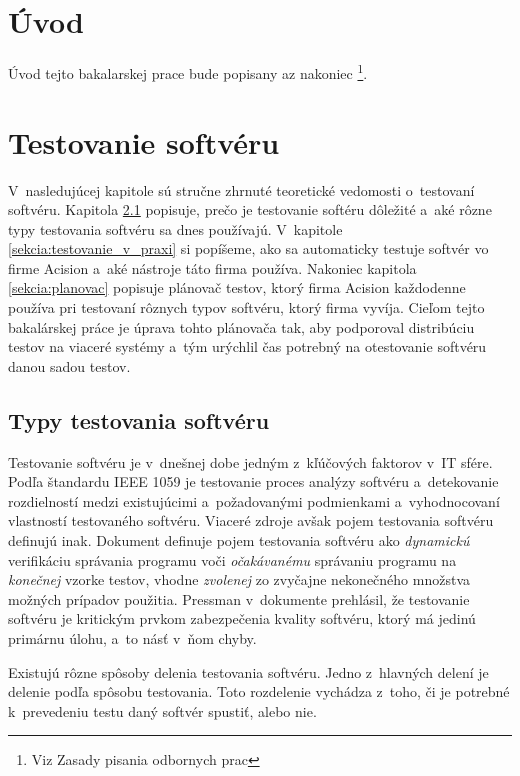 
\chapter{Úvod}
Úvod tejto bakalarskej prace bude popisany az nakoniec \footnote{Viz Zasady pisania odbornych prac}.
\chapter{Testovanie softvéru}
V~nasledujúcej kapitole sú stručne zhrnuté teoretické vedomosti o~testovaní softvéru.
Kapitola \ref{sekcia:typy_testovania} popisuje, prečo je testovanie softéru dôležité a~aké rôzne typy
testovania softvéru sa dnes používajú.
V~kapitole \ref{sekcia:testovanie_v_praxi} si popíšeme, ako sa automaticky testuje softvér vo firme Acision a~aké nástroje táto firma používa.
Nakoniec kapitola \ref{sekcia:planovac} popisuje plánovač testov, ktorý firma Acision každodenne používa 
pri testovaní rôznych typov softvéru, ktorý firma vyvíja. 
Cieľom tejto bakalárskej práce je úprava tohto plánovača tak, aby podporoval distribúciu testov na viaceré systémy 
a~tým urýchlil čas potrebný na otestovanie softvéru danou sadou testov. 

\section{Typy testovania softvéru} \label{sekcia:typy_testovania}
Testovanie softvéru je v~dnešnej dobe jedným z~kľúčových faktorov v~IT sfére.
Podľa štandardu IEEE 1059 \cite{Ieee} je testovanie proces analýzy softvéru a~detekovanie rozdielností medzi 
existujúcimi a~požadovanými podmienkami a~vyhodnocovaní vlastností testovaného softvéru.
Viaceré zdroje avšak pojem testovania softvéru definujú inak.
Dokument \cite{Swebok} definuje pojem testovania softvéru ako {\it dynamickú} verifikáciu správania programu voči {\it očakávanému} správaniu programu na {\it konečnej} vzorke
testov, vhodne {\it zvolenej} zo zvyčajne nekonečného množstva možných prípadov použitia.
Pressman v~dokumente \cite{Pressman} prehlásil, že testovanie softvéru je kritickým prvkom zabezpečenia kvality softvéru, ktorý má jedinú primárnu úlohu, a~to násť v~ňom chyby.  

Existujú rôzne spôsoby delenia testovania softvéru. Jedno z~hlavných delení je delenie podľa spôsobu testovania.
Toto rozdelenie vychádza z~toho, či je potrebné k~prevedeniu testu daný softvér spustiť, alebo nie.
